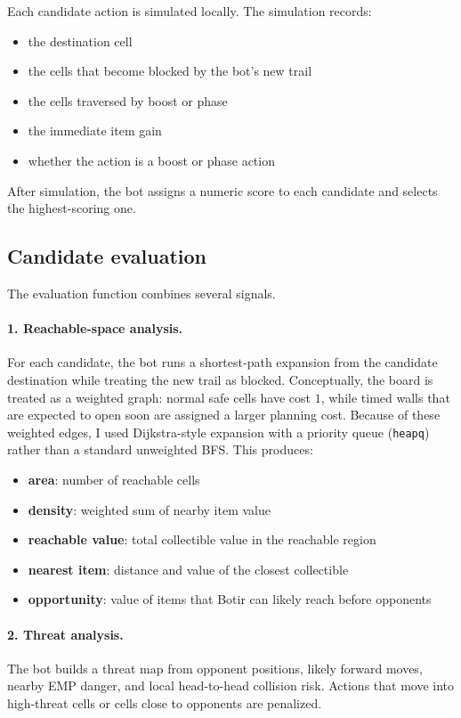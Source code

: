 \documentclass[11pt,a4paper]{article}
\begin{document}
Each candidate action is simulated locally. The simulation records:
\begin{itemize}[leftmargin=*]
    \item the destination cell
    \item the cells that become blocked by the bot's new trail
    \item the cells traversed by boost or phase
    \item the immediate item gain
    \item whether the action is a boost or phase action
\end{itemize}

After simulation, the bot assigns a numeric score to each candidate and selects the highest-scoring one.

\subsection{Candidate evaluation}
The evaluation function combines several signals.

\paragraph{1. Reachable-space analysis.}
For each candidate, the bot runs a shortest-path expansion from the candidate destination while treating the new trail as blocked. Conceptually, the board is treated as a weighted graph: normal safe cells have cost \(1\), while timed walls that are expected to open soon are assigned a larger planning cost. Because of these weighted edges, I used Dijkstra-style expansion with a priority queue (\texttt{heapq}) rather than a standard unweighted BFS. This produces:
\begin{itemize}[leftmargin=*]
    \item \textbf{area}: number of reachable cells
    \item \textbf{density}: weighted sum of nearby item value
    \item \textbf{reachable value}: total collectible value in the reachable region
    \item \textbf{nearest item}: distance and value of the closest collectible
    \item \textbf{opportunity}: value of items that Botir can likely reach before opponents
\end{itemize}

\paragraph{2. Threat analysis.}
The bot builds a threat map from opponent positions, likely forward moves, nearby EMP danger, and local head-to-head collision risk. Actions that move into high-threat cells or cells close to opponents are penalized.
\end{document}
